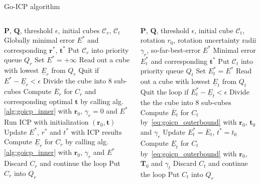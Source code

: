 \documentclass[aspectratio=1610]{beamer}
\begin{document}
\begin{frame}[shrink=36]{Go-ICP algorithm}
\begin{columns}
\begin{column}{0.5\textwidth}
  \begin{algorithm}[H] %
  \begin{algorithmic}[1]
  \REQUIRE $\bm{P}$, $\bm{Q}$, threshold $\epsilon$, initial cubes $\mathcal{C}_r$, $\mathcal{C}_t$
  \ENSURE Globally minimal error $E^*$ and corresponding $\bm{r}^*$, $\bm{t}^*$
  \STATE Put $\mathcal{C}_r$ into priority queue $Q_r$
  \STATE Set $E^*=+\infty$
  \LOOP
    \STATE Read out a cube with lowest $\underline{E}_r$ from $Q_r$
    \STATE Quit if $E^*-\underline{E}_r<\epsilon$
    \STATE Divide the cube into 8 sub-cubes
      \STATE Compute $\overline{E}_r$ for $C_r$ and corresponding optimal $\bm{t}$ by calling alg.\ref{alg:goicp_inner} with $\bm{r}_0$, $\gamma_r=0$ and $E^*$
        \STATE Run ICP with initialization $(\bm{r}_0,\bm{t})$
        \STATE Update $E^*$, $r^*$ and $t^*$ with ICP results
      \ENDIF
      \STATE Compute $\underline{E}_r$ for $C_r$ by calling alg.\ref{alg:goicp_inner} with $\bm{r}_0$, $\gamma_r$ and $E^*$
        \STATE Discard $C_r$ and continue the loop
      \ENDIF
      \STATE Put $C_r$ into $Q_r$
    \ENDFOR
  \ENDLOOP
  \end{algorithmic}
  \caption{Go-ICP -- Outer BnB}
  \label{alg:goicp_outer}
  \end{algorithm}
\end{column}

\begin{column}{0.5\textwidth}

  \begin{algorithm}[H] %
  \begin{algorithmic}[1]
  \REQUIRE $\bm{P}$, $\bm{Q}$, threshold $\epsilon$, initial cube $\mathcal{C}_t$, rotation $r_0$, rotation uncertainty radii $\gamma_r$, so-far-best-error $E^*$
  \ENSURE Minimal error $E_t^*$ and corresponding $\bm{t}^*$
  \STATE Put $\mathcal{C}_t$ into priority queue $Q_t$
  \STATE Set $E^*_t = E^*$
  \LOOP
    \STATE Read out a cube with lowest $\underline{E}_t$ from $Q_t$
    \STATE Quit the loop if $E_t^*-\underline{E}_t<\epsilon$
    \STATE Divide the the cube into 8 sub-cubes
      \STATE Compute $\overline{E}_t$ for $C_t$ by~\ref{eq:goicp_outerbound} with $\bm{r}_0$, $\bm{t}_0$ and $\gamma_r$
        \STATE Update $E_t^*=\overline{E}_t$, $t^*=t_0$
      \ENDIF
      \STATE Compute $\underline{E}_t$ for $C_t$ by~\ref{eq:goicp_outerbound} with $\bm{r}_0$, $\bm{T}_0$ and $\gamma_t$
        \STATE Discard $C_t$ and continue the loop
      \ENDIF
      \STATE Put $C_t$ into $Q_r$
    \ENDFOR
  \ENDLOOP
  \end{algorithmic}
  \caption{Go-ICP -- Inner BnB}
  \label{alg:goicp_inner}
  \end{algorithm}

\end{column}
\end{columns}
\end{frame}
\end{document}
